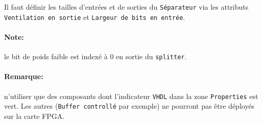Il faut définir les tailles d'entrées et de sorties du \texttt{Séparateur} via les attributs \texttt{Ventilation en sortie} et
\texttt{Largeur de bits en entrée}.

\paragraph{Note:} le bit de poids faible est indexé à 0 en sortie du \texttt{splitter}.

\paragraph{Remarque:} n'utiliser que des composants dont l'indicateur \texttt{VHDL} dans la zone \texttt{Properties} est vert. 
Les autres (\texttt{Buffer controllé} par exemple) ne pourront pas être déployés sur la carte FPGA.
